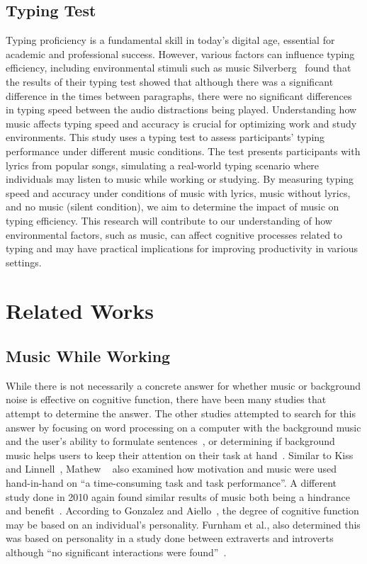 \documentclass[manuscript, screen, review]{acmart} %
\begin{document}
\subsection{Typing Test}
Typing proficiency is a fundamental skill in today's digital age, essential for academic and professional success. 
However, various factors can influence typing efficiency, including environmental stimuli such as music Silverberg~\cite{AudioDistractionsAshley} found that the results of their typing test showed that although there was a significant difference in the times between paragraphs, there were no significant differences in typing speed between the audio distractions being played. 
Understanding how music affects typing speed and accuracy is crucial for optimizing work and study environments.
This study uses a typing test to assess participants' typing performance under different music conditions. 
The test presents participants with lyrics from popular songs, simulating a real-world typing scenario where individuals may listen to music while working or studying.
By measuring typing speed and accuracy under conditions of music with lyrics, music without lyrics, and no music (silent condition), we aim to determine the impact of music on typing efficiency. 
This research will contribute to our understanding of how environmental factors, such as music, can affect cognitive processes related to typing and may have practical implications for improving productivity in various settings.

\section{Related Works}
\subsection{Music While Working}
While there is not necessarily a concrete answer for whether music or background noise is effective on cognitive function, there have been many
studies that attempt to determine the answer. 
The other studies attempted to search for this answer by focusing on word processing on a computer with the background music and the user's ability to formulate sentences~\cite{ransdell2001141}, or determining if background music helps users to keep their attention on their task at hand~\cite{kiss2021effect}. 
Similar to Kiss and Linnell~\cite{kiss2021effect}, Mathew ~\cite{mathew2022inherently} also examined how motivation and music were used hand-in-hand on ``a time-consuming task and task performance''. 
A different study done in 2010 again found similar results of music both being a hindrance and benefit~\cite{AudioDistractionsAshley}. 
According to Gonzalez and Aiello~\cite{Gonzalez_Aiello_2019}, the degree of cognitive function may be based on an individual's personality. 
Furnham et al., also determined this was based on personality in a study done between extraverts and introverts although ``no significant interactions were found''~\cite{distractingEffectsFurnham}.
\end{document}
